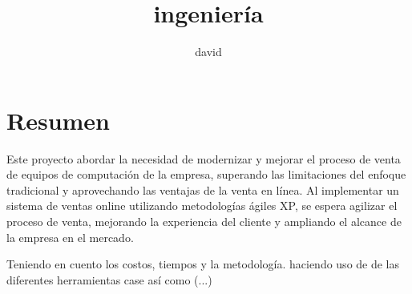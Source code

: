 \documentclass[12pt,a4paper]{article}
\title{ingeniería}
\author{david}
\newcommand{\espacio}{\par\vspace{3mm}}
\newcommand{\logoleft}{images/Sistemaslogo.png}
\newcommand{\logoright}{images/Logo_UNAP.png}
\newcommand{\newsection}[1]{\section{\hspace{6mm} #1}}%
\newcommand{\empresa}{Pantera Digital World S.A.C. }
\renewcommand{\thesection}{\Roman{section}}%
\begin{document}

\newpage
\tableofcontents
\newpage

\pagestyle{fancy}
\fancyhf{} %
\renewcommand{\headrulewidth}{3pt}
\renewcommand{\headrule}{\hbox to\headwidth{\color{azul}\leaders\hrule height \headrulewidth\hfill}}



\fancyfoot[R]{\thepage}




\newsection{Resumen}
%
Este proyecto abordar la necesidad de modernizar y mejorar el proceso de venta de equipos de computación de la empresa, superando las limitaciones del enfoque tradicional y aprovechando las ventajas de la venta en línea. Al implementar un sistema de ventas online utilizando metodologías ágiles XP, se espera agilizar el proceso de venta, mejorando la experiencia del cliente y ampliando el alcance de la empresa en el mercado.
\espacio
Teniendo en cuento los costos, tiempos y la metodología. 
haciendo uso de de las diferentes herramientas case así como (...)
 
\end{document}
